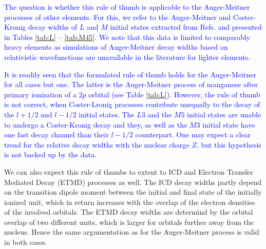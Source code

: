 \textcolor{blue}
{
%

The question is whether this rule of thumb is applicable to the Auger-Meitner
processes of other elements. For this, we refer to the Auger-Meitner and
Coster-Kronig decay widths of $L$ and $M$ initial states extracted from Refs.
\cite{Chen81,Chen83,Chen80} and presented in Tables \ref{tab:L} -- \ref{tab:M45}.
We note that this data is limited to comparably heavy elements as simulations
of Auger-Meitner decay widths based on relativistic wavefunctions are unavailable
in the literature for lighter elements.

%

It is readily seen that the formulated rule of thumb holds for the Auger-Meitner
for all cases but one. The latter is the Auger-Meitner process of manganese after
primary ionization of a $2p$ orbital (see Table \ref{tab:L}).
However, the rule of thumb is not correct, when Coster-Lronig processes contribute
unequally to the decay of the $l+1/2$ and $l-1/2$ initial states.
The $L3$ and the $M5$ initial states are unable to undergo a Coster-Kronig decay
and they, as well as the $M3$ initial state have one fast decay channel than their
$l-1/2$ counterpart.
One may expect a clear trend for the relative decay widths with the nuclear charge
$Z$, but this hypothesis is not backed up by the data.

%
}

We can also expect this rule of thumbs to extent to ICD and
Electron Transfer Mediated Decay (ETMD) processes as well. The ICD
decay widths partly depend on the transition dipole moment between the
initial and final state of the initially ionized unit, which in return increases
with the overlap of the electron densities of the involved orbitals.
The ETMD decay widths are determind by the orbital overlap of two different units,
which is larger for orbitals further away from the nucleus.
Hence the same argumentation as for the Auger-Meitner process is valid in both
cases.



